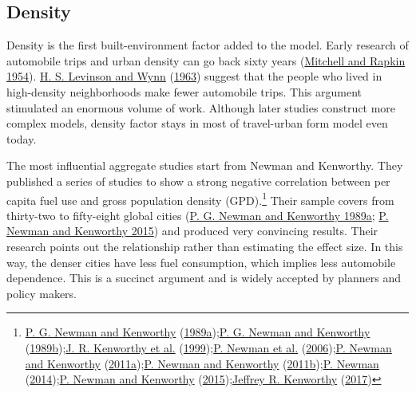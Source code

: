 \documentclass[
  11pt,
  openany]{memoir}
\begin{document}
\hypertarget{density}{%
\subsection{Density}\label{density}}

Density is the first built-environment factor added to the model. Early research of automobile trips and urban density can go back sixty years (\protect\hyperlink{ref-mitchellUrbanTraffic1954}{Mitchell and Rapkin 1954}). \protect\hyperlink{ref-levinsonEFFECTSDENSITYURBAN1963}{H. S. Levinson and Wynn} (\protect\hyperlink{ref-levinsonEFFECTSDENSITYURBAN1963}{1963}) suggest that the people who lived in high-density neighborhoods make fewer automobile trips. This argument stimulated an enormous volume of work. Although later studies construct more complex models, density factor stays in most of travel-urban form model even today.

The most influential aggregate studies start from Newman and Kenworthy. They published a series of studies to show a strong negative correlation between per capita fuel use and gross population density (GPD).\footnote{\protect\hyperlink{ref-newmanCITIESAUTOMOBILEDEPENDENCE1989}{P. G. Newman and Kenworthy} (\protect\hyperlink{ref-newmanCITIESAUTOMOBILEDEPENDENCE1989}{1989a});\protect\hyperlink{ref-newmanGasolineConsumptionCities1989}{P. G. Newman and Kenworthy} (\protect\hyperlink{ref-newmanGasolineConsumptionCities1989}{1989b});\protect\hyperlink{ref-kenworthyINTERNATIONALSOURCEBOOKAUTOMOBILE1999}{J. R. Kenworthy et al.} (\protect\hyperlink{ref-kenworthyINTERNATIONALSOURCEBOOKAUTOMOBILE1999}{1999});\protect\hyperlink{ref-newmanUrbanDesignReduce2006}{P. Newman et al.} (\protect\hyperlink{ref-newmanUrbanDesignReduce2006}{2006});\protect\hyperlink{ref-newmanPeakCarUse2011}{P. Newman and Kenworthy} (\protect\hyperlink{ref-newmanPeakCarUse2011}{2011a});\protect\hyperlink{ref-newmanDensityMultiplierResponse2011}{P. Newman and Kenworthy} (\protect\hyperlink{ref-newmanDensityMultiplierResponse2011}{2011b});\protect\hyperlink{ref-newmanDensitySustainabilityMultiplier2014}{P. Newman} (\protect\hyperlink{ref-newmanDensitySustainabilityMultiplier2014}{2014});\protect\hyperlink{ref-newmanEndAutomobileDependence2015}{P. Newman and Kenworthy} (\protect\hyperlink{ref-newmanEndAutomobileDependence2015}{2015});\protect\hyperlink{ref-kenworthyAutomobileDependenceEmerging2017}{Jeffrey R. Kenworthy} (\protect\hyperlink{ref-kenworthyAutomobileDependenceEmerging2017}{2017})} Their sample covers from thirty-two to fifty-eight global cities (\protect\hyperlink{ref-newmanCITIESAUTOMOBILEDEPENDENCE1989}{P. G. Newman and Kenworthy 1989a}; \protect\hyperlink{ref-newmanEndAutomobileDependence2015}{P. Newman and Kenworthy 2015}) and produced very convincing results. Their research points out the relationship rather than estimating the effect size. In this way, the denser cities have less fuel consumption, which implies less automobile dependence. This is a succinct argument and is widely accepted by planners and policy makers.
\end{document}
